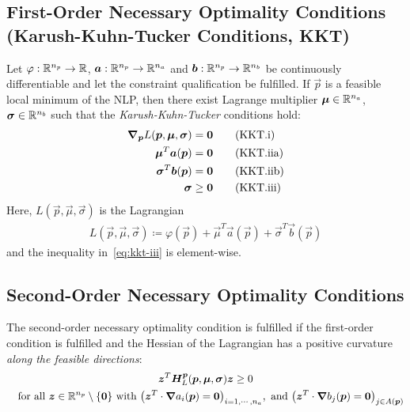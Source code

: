 		\subsection{First-Order Necessary Optimality Conditions (Karush-Kuhn-Tucker Conditions, KKT)}
			Let \( \varphi : \mathbb{R}^{n_p} \to \mathbb{R} \), \( \bm{a} : \mathbb{R}^{n_p} \to \mathbb{R}^{n_a} \) and \( \bm{b} : \mathbb{R}^{n_p} \to \mathbb{R}^{n_b} \) be continuously differentiable and let the constraint qualification be fulfilled. If \( \vec{p} \) is a feasible local minimum of the NLP, then there exist Lagrange multiplier \( \bm{\mu} \in \mathbb{R}^{n_a} \), \( \bm{\sigma} \in \mathbb{R}^{n_b} \) such that the \emph{Karush-Kuhn-Tucker} conditions hold:
			\begin{align}
				\grad_{\bm{p}}L(\bm{p}, \bm{\mu}, \bm{\sigma}) & = \bm{0}    \tag{KKT.i}   \\
				\bm{\mu}^T \bm{a}(\bm{p})                       & = \bm{0}    \tag{KKT.iia} \\
				\bm{\sigma}^T \bm{b}(\bm{p})                    & = \bm{0}    \tag{KKT.iib} \\
				\bm{\sigma}                                       & \geq \bm{0} \tag{KKT.iii} \label{eq:kkt-iii}
			\end{align}
			Here, \( L(\vec{p}, \vec{\mu}, \vec{\sigma}) \) is the Lagrangian
			\begin{align*}
				L(\vec{p}, \vec{\mu}, \vec{\sigma}) \coloneqq \varphi(\vec{p}) + \vec{\mu}^T \vec{a}(\vec{p}) + \vec{\sigma}^T \vec{b}(\vec{p})
			\end{align*}
			and the inequality in~\eqref{eq:kkt-iii} is element-wise.

		\subsection{Second-Order Necessary Optimality Conditions}
			The second-order necessary optimality condition is fulfilled if the first-order condition is fulfilled and the Hessian of the Lagrangian has a positive curvature \emph{along the feasible directions}:
			\begin{gather*}
				\bm{z}^T \bm{H}_L^{\bm{p}}(\bm{p}, \bm{\mu}, \bm{\sigma}) \bm{z} \geq 0 \\
				\quad\text{for all }
				\bm{z} \in \mathbb{R}^{n_p} \setminus \{\bm{0}\}
				\text{ with }
				\big( \bm{z}^T \cdot \grad{a_i}(\bm{p}) = \bm{0} \big)_{i = 1, \cdots, n_a},
				\text{ and }
				\big( \bm{z}^T \cdot \grad{b_j}(\bm{p}) = \bm{0} \big)_{j \in A(\bm{p})}
			\end{gather*}

